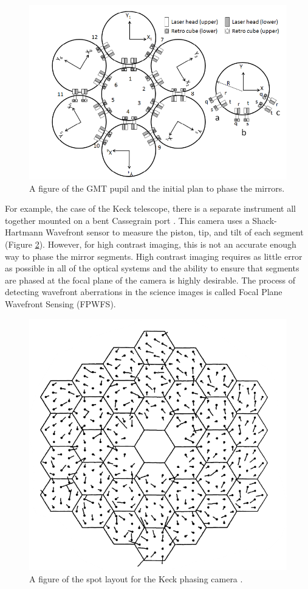 \begin{figure}[H]
\centering
\includegraphics[width=12 cm]{Figures/GMT_phase_measure.png}
\caption{A figure of the GMT pupil and the initial plan to phase the mirrors\cite{Acton2012PhasingGMT}.}
\label{fig:GMT_phase}
\end{figure}


For example, the case of the Keck telescope, there is a separate instrument all together mounted on a bent Cassegrain port \cite{Chanan1994}.  This camera uses a Shack-Hartmann Wavefront sensor to measure the piston, tip, and tilt of each segment (Figure \ref{fig:Keck_phase}).  However, for high contrast imaging, this is not an accurate enough way to phase the mirror segments.  High contrast imaging requires as little error as possible in all of the optical systems and the ability to ensure that segments are phased at the focal plane of the camera is highly desirable.  The process of detecting wavefront aberrations in the science images is called Focal Plane Wavefront Sensing (FPWFS).  

\begin{figure}[H]
\centering
\includegraphics[width=8 cm]{Figures/keck_phasing.png}
\caption{A figure of the spot layout for the Keck phasing camera \cite{Chanan1994}.}
\label{fig:Keck_phase}
\end{figure}


